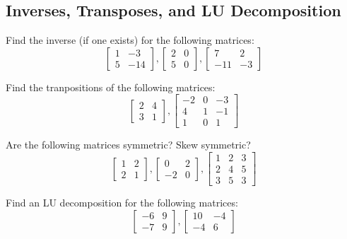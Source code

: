\documentclass[11pt]{exam}
\begin{document}
    \subsection{Inverses, Transposes, and LU Decomposition}
    \begin{questions}
        \item Find the inverse (if one exists) for the following matrices:
        $$\begin{bmatrix} 1 & -3 \\ 5 & -14 \end{bmatrix}, \begin{bmatrix} 2 & 0 \\ 5 & 0 \end{bmatrix}, \begin{bmatrix} 7 & 2 \\ -11 & -3 \end{bmatrix}$$
        \item Find the tranpositions of the following matrices:
        $$\begin{bmatrix} 2 & 4 \\ 3 & 1 \end{bmatrix}, \begin{bmatrix} -2 & 0 & -3 \\ 4 & 1 & -1 \\ 1 & 0 & 1 \end{bmatrix}$$
        \item Are the following matrices symmetric? Skew symmetric?
        $$\begin{bmatrix} 1 & 2 \\ 2 & 1 \end{bmatrix},
          \begin{bmatrix} 0 & 2 \\ -2 & 0 \end{bmatrix},
          \begin{bmatrix} 1 & 2 & 3 \\ 2 & 4 & 5 \\ 3 & 5 & 3 \end{bmatrix}$$
        \item Find an LU decomposition for the following matrices:
        $$\begin{bmatrix} -6 & 9 \\ -7 & 9 \end{bmatrix}, \begin{bmatrix} 10 & -4 \\ -4 & 6 \end{bmatrix}$$
    \end{questions}
\end{document}
